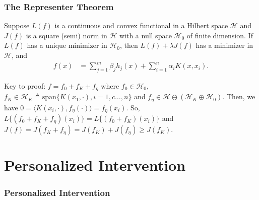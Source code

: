 \documentclass[notes=no]{beamer}
\def\cal{\mathcal}
\begin{document}
\begin{frame}
	\frametitle{The Representer Theorem}
	\begin{theorem}
		Suppose $L(f)$ is a continuous and convex functional in a Hilbert space ${\cal H}$ and $J(f)$ is a square (semi) norm in ${\cal H}$ with a null space ${\cal H}_0$ of finite dimension. If $L(f)$ has a unique minimizer in ${\cal H}_0$, then $L(f)+\lambda J(f)$ has a minimizer in ${\cal H}$, and
		\begin{align*}
			f(x) &= \sum_{j=1}^m \beta_j h_j(x) + \sum_{i=1}^n \alpha_i K(x,x_i).
		\end{align*}
	
	\end{theorem}
	Key to proof: $f=f_0+f_K + f_{\eta}$ where $f_0 \in {\cal H}_0$, $f_K \in {\cal H}_K \triangleq\mbox{span}\{K(x_1,\cdot), i=1,c\dots,n\}$ and $f_\eta \in {\cal H}\ominus({\cal H}_K\oplus{\cal H}_0)$. Then, we have $0=\langle K(x_i,\cdot), f_\eta(\cdot)\rangle=f_\eta(x_i)$. So, $L\{(f_0+f_K + f_{\eta})(x_i)\}=L\{(f_0+f_K)(x_i)\}$ and $J(f)=J(f_K+f_\eta)=J(f_K)+J(f_\eta) \ge J(f_K)$.
\end{frame}

\section{Personalized Intervention}
\begin{frame}
\frametitle{Personalized Intervention}	
\end{frame}
\end{document}
